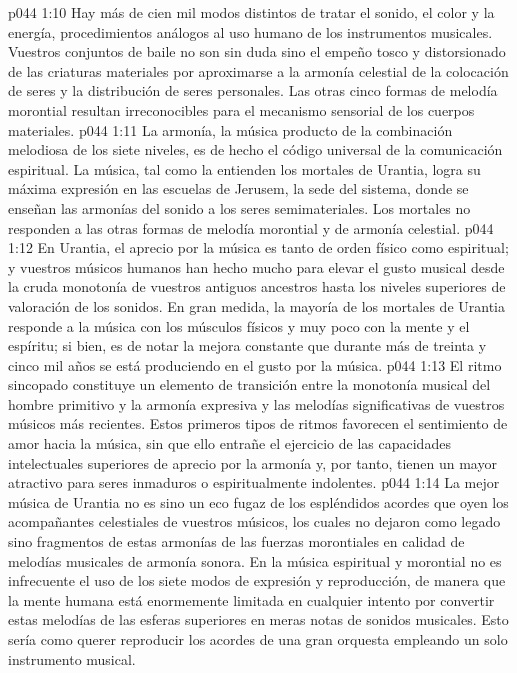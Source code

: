\vs p044 1:10 \pc Hay más de cien mil modos distintos de tratar el sonido, el color y la energía, procedimientos análogos al uso humano de los instrumentos musicales. Vuestros conjuntos de baile no son sin duda sino el empeño tosco y distorsionado de las criaturas materiales por aproximarse a la armonía celestial de la colocación de seres y la distribución de seres personales. Las otras cinco formas de melodía morontial resultan irreconocibles para el mecanismo sensorial de los cuerpos materiales.
\vs p044 1:11 La armonía, la música producto de la combinación melodiosa de los siete niveles, es de hecho el código universal de la comunicación espiritual. La música, tal como la entienden los mortales de Urantia, logra su máxima expresión en las escuelas de Jerusem, la sede del sistema, donde se enseñan las armonías del sonido a los seres semimateriales. Los mortales no responden a las otras formas de melodía morontial y de armonía celestial.
\vs p044 1:12 \pc En Urantia, el aprecio por la música es tanto de orden físico como espiritual; y vuestros músicos humanos han hecho mucho para elevar el gusto musical desde la cruda monotonía de vuestros antiguos ancestros hasta los niveles superiores de valoración de los sonidos. En gran medida, la mayoría de los mortales de Urantia responde a la música con los músculos físicos y muy poco con la mente y el espíritu; si bien, es de notar la mejora constante que durante más de treinta y cinco mil años se está produciendo en el gusto por la música.
\vs p044 1:13 El ritmo sincopado constituye un elemento de transición entre la monotonía musical del hombre primitivo y la armonía expresiva y las melodías significativas de vuestros músicos más recientes. Estos primeros tipos de ritmos favorecen el sentimiento de amor hacia la música, sin que ello entrañe el ejercicio de las capacidades intelectuales superiores de aprecio por la armonía y, por tanto, tienen un mayor atractivo para seres inmaduros o espiritualmente indolentes.
\vs p044 1:14 \pc La mejor música de Urantia no es sino un eco fugaz de los espléndidos acordes que oyen los acompañantes celestiales de vuestros músicos, los cuales no dejaron como legado sino fragmentos de estas armonías de las fuerzas morontiales en calidad de melodías musicales de armonía sonora. En la música espiritual y morontial no es infrecuente el uso de los siete modos de expresión y reproducción, de manera que la mente humana está enormemente limitada en cualquier intento por convertir estas melodías de las esferas superiores en meras notas de sonidos musicales. Esto sería como querer reproducir los acordes de una gran orquesta empleando un solo instrumento musical.
